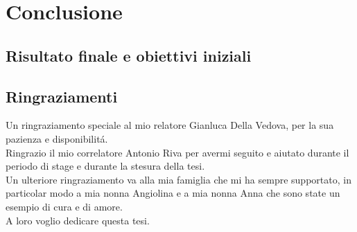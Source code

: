 \chapter{Conclusione}
    \section{Risultato finale e obiettivi iniziali}

    \section{Ringraziamenti}
    
    Un ringraziamento speciale al mio relatore Gianluca Della Vedova, per la sua pazienza e disponibilit\'a.\\

    Ringrazio il mio correlatore Antonio Riva per avermi seguito e aiutato durante il periodo di stage e durante la stesura della tesi.\\

    Un ulteriore ringraziamento va alla mia famiglia che mi ha sempre supportato, in particolar modo a mia nonna Angiolina e a mia nonna Anna che sono state un esempio di cura e di amore.\\
    A loro voglio dedicare questa tesi.\\
